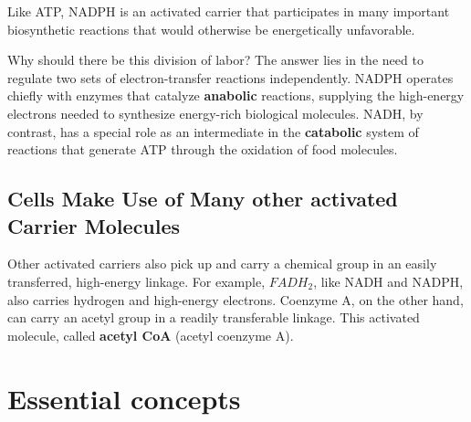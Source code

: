 Like ATP, NADPH is an activated carrier that participates in many
important biosynthetic reactions that would otherwise be energetically
unfavorable.

Why should there be this division of labor? The answer lies in the need
to regulate two sets of electron-transfer reactions independently. NADPH
operates chiefly with enzymes that catalyze \textbf{anabolic} reactions, supplying
the high-energy electrons needed to synthesize energy-rich biological
molecules. NADH, by contrast, has a special role as an intermediate in
the \textbf{catabolic} system of reactions that generate ATP through the oxidation
of food molecules.

\subsection{Cells Make Use of Many other activated Carrier Molecules}

Other activated carriers also pick up and carry a chemical group in an
easily transferred, high-energy linkage. For example, \textbf{$FADH_{2}$},
like NADH and NADPH, also carries hydrogen and high-energy electrons.
Coenzyme A, on the other hand, can carry an acetyl
group in a readily transferable linkage. This activated molecule, called
\textbf{acetyl CoA} (acetyl coenzyme A).

\section{Essential concepts}

